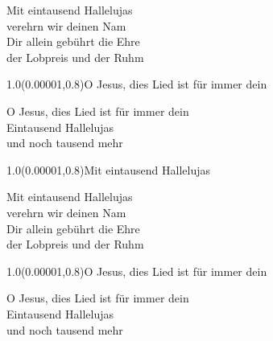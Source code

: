 \documentclass[aspectratio=169]{beamer}
\begin{document}
\begin{frame}
\centering
\color{white}
\huge{Mit eintausend Hallelujas} \\
\huge{verehrn wir deinen Nam} \\
\huge{Dir allein gebührt die Ehre} \\
\huge{der Lobpreis und der Ruhm} \\

\begin{textblock}{1.0}(0.00001,0.8)\color{gray}\normalsize{O Jesus, dies Lied ist für immer dein}\end{textblock}
\end{frame}

\begin{frame}
\centering
\color{white}
\huge{O Jesus, dies Lied ist für immer dein} \\
\huge{Eintausend Hallelujas} \\
\huge{und noch tausend mehr} \\

\begin{textblock}{1.0}(0.00001,0.8)\color{gray}\normalsize{Mit eintausend Hallelujas}\end{textblock}
\end{frame}

\begin{frame}
\centering
\color{white}
\huge{Mit eintausend Hallelujas} \\
\huge{verehrn wir deinen Nam} \\
\huge{Dir allein gebührt die Ehre} \\
\huge{der Lobpreis und der Ruhm} \\

\begin{textblock}{1.0}(0.00001,0.8)\color{gray}\normalsize{O Jesus, dies Lied ist für immer dein}\end{textblock}
\end{frame}

\begin{frame}
\centering
\color{white}
\huge{O Jesus, dies Lied ist für immer dein} \\
\huge{Eintausend Hallelujas} \\
\huge{und noch tausend mehr} \\
\end{frame}
\end{document}
